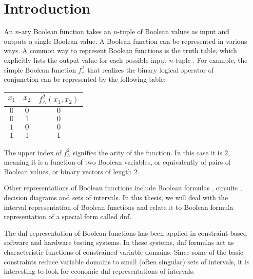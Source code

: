 \chapter*{Introduction}

An $n$-ary Boolean function takes an $n$-tuple of Boolean values as input
and outputs a single Boolean value.
A Boolean function can be represented in various ways.
A common way to represent Boolean functions
is the truth table,
which explicitly lists the output value for each possible input $n$-tuple \citep[Definition 1.2]{Crama2011}.
For example,
the simple Boolean function $f^2_{\wedge}$ that realizes the binary logical operator of conjunction
can be represented by the following table:
\begin{center}
\begin{tabular}{cc|c}
$x_1$ & $x_2$ & $f^2_{\wedge}(x_1, x_2)$ \\
\hline
$0$ & $0$ & $0$ \\
$0$ & $1$ & $0$ \\
$1$ & $0$ & $0$ \\
$1$ & $1$ & $1$ \\
\end{tabular}
\end{center}

The upper index of $f^2_{\wedge}$
signifies the arity of the function.
In this case it is $2$,
meaning it is a function of two Boolean variables,
or equivalently of pairs of Boolean values,
or binary vectors of length $2$.

Other representations of Boolean functions
include
Boolean formulas \citep[Definition 1.4]{Crama2011},
circuits
\citep[Definition 3.1]{Wegener1987},
decision diagrams
and sets of intervals.
In this thesis,
we will deal with the interval representation of Boolean functions
and relate it to Boolean formula representation
of a special form called \acrfull{dnf}.

The \acrshort{dnf} representation of Boolean functions
has been applied in constraint-based software
\citep{DeMillo1991} %
and hardware
\citep{Lewin1995} %
testing systems.
In these systems,
\acrshort{dnf} formulas act as characteristic functions
of constrained variable domains.
Since some of the basic constraints
reduce variable domains to small (often singular) sets of intervals,
it is interesting to look for economic \acrshort{dnf}
representations of intervals.

